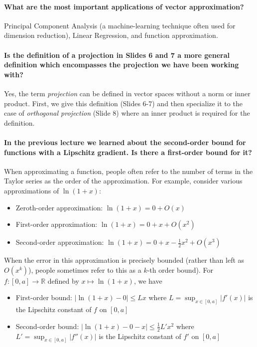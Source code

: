 \documentclass[10pt,english]{article}
\begin{document}
\paragraph{What are the most important applications of vector approximation?}
Principal Component Analysis (a machine-learning technique often used for dimension reduction), Linear Regression, and function approximation.

\paragraph{Is the definition of a projection in Slides 6 and 7 a more general definition which encompasses the projection we have been working with?}
Yes, the term \emph{projection} can be defined in vector spaces without a norm or inner product.
First, we give this definition (Slides 6-7) and then specialize it to the case of \emph{orthogonal projection} (Slide 8) where an inner product is required for the definition.


\paragraph{In the previous lecture we learned about the second-order bound for functions with a Lipschitz gradient. Is there a first-order bound for it?}
When approximating a function, people often refer to the number of terms in the Taylor series as the order of the approximation.
For example, consider various approximations of $\ln (1+x)$:
\begin{itemize}
\item Zeroth-order approximation: $\ln(1+x) = 0 + O(x)$
\item First-order approximation: $\ln(1+x) = 0 + x + O(x^2)$
\item Second-order approximation: $\ln(1+x) = 0 + x - \frac{1}{2}x^2 + O(x^3)$
\end{itemize}
When the error in this approximation is precisely bounded (rather than left as $O(x^k)$), people sometimes refer to this as a $k$-th order bound).
For $f\colon [0,a] \to \mathbb{R}$ defined by $x \mapsto \ln (1+x)$, we have
\begin{itemize}
\item First-order bound: $|\ln(1+x) - 0| \leq L x $ where $L= \sup_{x\in[0,a]} |f'(x)|$ is the Lipschitz constant of $f$ on $[0,a]$
\item Second-order bound: $|\ln(1+x) - 0 - x| \leq \frac{1}{2} L' x^2$ where $L' = \sup_{x\in[0,a]} |f''(x)|$ is the Lipschitz constant of $f'$ on $[0,a]$
\end{itemize}
\end{document}

